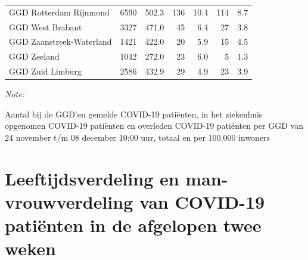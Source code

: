 \documentclass[
  english,
  man,floatsintext]{apa6}
\begin{document}
\begin{table}[H]
\begin{threeparttable}
\begin{tabular}{lrrrrrr}
GGD Rotterdam Rijnmond & 6590 & 502.3 & 136 & 10.4 & 114 & 8.7\\
GGD West Brabant & 3327 & 471.0 & 45 & 6.4 & 27 & 3.8\\
GGD Zaanstreek-Waterland & 1421 & 422.0 & 20 & 5.9 & 15 & 4.5\\
GGD Zeeland & 1042 & 272.0 & 23 & 6.0 & 5 & 1.3\\
GGD Zuid Limburg & 2586 & 432.9 & 29 & 4.9 & 23 & 3.9\\
\bottomrule
\end{tabular}
\begin{tablenotes}
\item \textit{Note: } 
\item Aantal bij de GGD’en gemelde COVID-19 patiënten, in het ziekenhuis opgenomen COVID-19 patiënten en overleden COVID-19 patiënten per GGD van 24 november t/m 08 december 10:00 uur, totaal en per 100.000 inwoners
\end{tablenotes}
\end{threeparttable}
\endgroup{}
\end{table}

\newpage

\hypertarget{leeftijdsverdeling-en-man-vrouwverdeling-van-covid-19-patiuxebnten-in-de-afgelopen-twee-weken}{%
\section{Leeftijdsverdeling en man-vrouwverdeling van COVID-19 patiënten in de afgelopen twee weken}\label{leeftijdsverdeling-en-man-vrouwverdeling-van-covid-19-patiuxebnten-in-de-afgelopen-twee-weken}}
\end{document}
